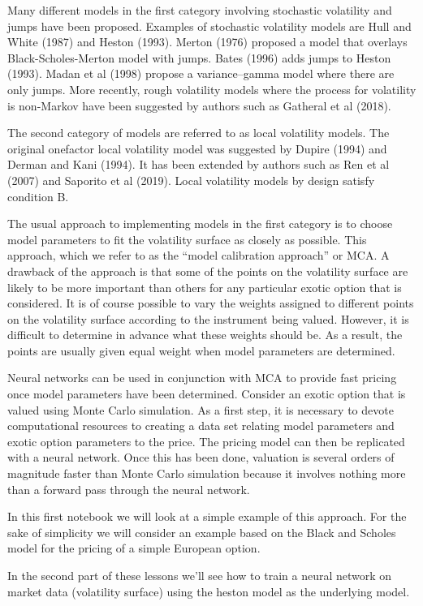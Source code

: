 \documentclass[11pt]{article}
\begin{document}
Many different models in the first category involving stochastic
volatility and jumps have been proposed. Examples of stochastic
volatility models are Hull and White (1987) and Heston (1993). Merton
(1976) proposed a model that overlays Black-Scholes-Merton model with
jumps. Bates (1996) adds jumps to Heston (1993). Madan et al (1998)
propose a variance--gamma model where there are only jumps. More
recently, rough volatility models where the process for volatility is
non-Markov have been suggested by authors such as Gatheral et al (2018).

The second category of models are referred to as local volatility
models. The original onefactor local volatility model was suggested by
Dupire (1994) and Derman and Kani (1994). It has been extended by
authors such as Ren et al (2007) and Saporito et al (2019). Local
volatility models by design satisfy condition B.

The usual approach to implementing models in the first category is to
choose model parameters to fit the volatility surface as closely as
possible. This approach, which we refer to as the ``model calibration
approach'' or MCA. A drawback of the approach is that some of the points
on the volatility surface are likely to be more important than others
for any particular exotic option that is considered. It is of course
possible to vary the weights assigned to different points on the
volatility surface according to the instrument being valued. However, it
is difficult to determine in advance what these weights should be. As a
result, the points are usually given equal weight when model parameters
are determined.

Neural networks can be used in conjunction with MCA to provide fast
pricing once model parameters have been determined. Consider an exotic
option that is valued using Monte Carlo simulation. As a first step, it
is necessary to devote computational resources to creating a data set
relating model parameters and exotic option parameters to the price. The
pricing model can then be replicated with a neural network. Once this
has been done, valuation is several orders of magnitude faster than
Monte Carlo simulation because it involves nothing more than a forward
pass through the neural network.

In this first notebook we will look at a simple example of this
approach. For the sake of simplicity we will consider an example based
on the Black and Scholes model for the pricing of a simple European
option.

In the second part of these lessons we'll see how to train a neural
network on market data (volatility surface) using the heston model as
the underlying model.
\end{document}
